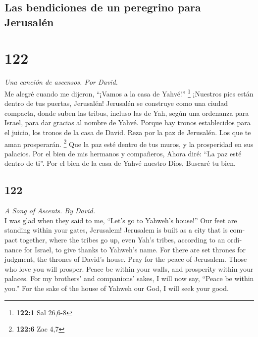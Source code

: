 \begin{paracol}{2}
\hypertarget{las-bendiciones-de-un-peregrino-para-jerusaluxe9n}{%
\subsection{Las bendiciones de un peregrino para
Jerusalén}\label{las-bendiciones-de-un-peregrino-para-jerusaluxe9n}}

\hypertarget{section-242}{%
\section{122}\label{section-242}}

\emph{Una canción de ascensos. Por David.}\\
 Me alegré cuando me dijeron, ``¡Vamos a la casa de
Yahvé!'' \footnote{\textbf{122:1} Sal 26,6-8}  ¡Nuestros
pies están dentro de tus puertas, Jerusalén!  Jerusalén se
construye como una ciudad compacta,  donde suben las
tribus, incluso las de Yah, según una ordenanza para Israel, para dar
gracias al nombre de Yahvé.  Porque hay tronos
establecidos para el juicio, los tronos de la casa de David.
 Reza por la paz de Jerusalén. Los que te aman
prosperarán. \footnote{\textbf{122:6} Zac 4,7}  Que la paz
esté dentro de tus muros, y la prosperidad en sus palacios.
 Por el bien de mis hermanos y compañeros, Ahora diré:
``La paz esté dentro de ti''.  Por el bien de la casa de
Yahvé nuestro Dios, Buscaré tu bien.

\switchcolumn
\begin{otherlanguage}{english}

\hypertarget{section-243}{%
\section{122}\label{section-243}}

\emph{A Song of Ascents. By David.}\\
 I was glad when they said to me, ``Let's go to Yahweh's
house!''  Our feet are standing within your gates,
Jerusalem!  Jerusalem is built as a city that is compact
together,  where the tribes go up, even Yah's tribes,
according to an ordinance for Israel, to give thanks to Yahweh's name.
 For there are set thrones for judgment, the thrones of
David's house.  Pray for the peace of Jerusalem. Those who
love you will prosper.  Peace be within your walls, and
prosperity within your palaces.  For my brothers' and
companions' sakes, I will now say, ``Peace be within you.''
 For the sake of the house of Yahweh our God, I will seek
your good.


\end{otherlanguage}
\end{paracol}
